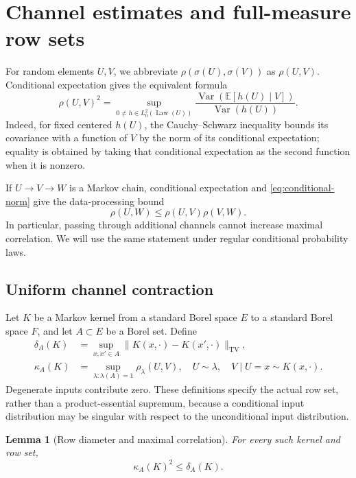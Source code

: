 \documentclass[11pt]{amsart}
\numberwithin{equation}{section}
\newtheorem{lemma}[theorem]{Lemma}
\theoremstyle{definition}
\newcommand{\EE}{\mathbb E}
\newcommand{\TV}{\mathrm{TV}}
\newcommand{\Law}{\operatorname{Law}}
\newcommand{\Var}{\operatorname{Var}}
\begin{document}
\section{Channel estimates and full-measure row sets}\label{sec:channels}

For random elements $U,V$, we abbreviate $\rho(\sigma(U),\sigma(V))$ as $\rho(U,V)$. Conditional expectation gives the equivalent formula
\begin{equation}\label{eq:conditional-norm}
\rho(U,V)^2=
\sup_{0\ne h\in L^2_0(\Law(U))}
\frac{\Var(\EE[h(U)\mid V])}{\Var(h(U))}.
\end{equation}
Indeed, for fixed centered $h(U)$, the Cauchy--Schwarz inequality bounds its covariance with a function of $V$ by the norm of its conditional expectation; equality is obtained by taking that conditional expectation as the second function when it is nonzero.

If $U\longrightarrow V\longrightarrow W$ is a Markov chain, conditional expectation and \eqref{eq:conditional-norm} give the data-processing bound
\begin{equation}\label{eq:dp}
\rho(U,W)\le\rho(U,V)\rho(V,W).
\end{equation}
In particular, passing through additional channels cannot increase maximal correlation. We will use the same statement under regular conditional probability laws.

\subsection{Uniform channel contraction}
Let $K$ be a Markov kernel from a standard Borel space $E$ to a standard Borel space $F$, and let $A\subset E$ be a Borel set. Define
\begin{align}
\delta_A(K)&=\sup_{x,x'\in A}\|K(x,\cdot)-K(x',\cdot)\|_{\TV},\label{eq:diameter}\\
\kappa_A(K)&=\sup_{\lambda:\lambda(A)=1}\rho_\lambda(U,V),
\quad U\sim\lambda,\quad V\mid U=x\sim K(x,\cdot).\label{eq:robust}
\end{align}
Degenerate inputs contribute zero. These definitions specify the actual row set, rather than a product-essential supremum, because a conditional input distribution may be singular with respect to the unconditional input distribution.

\begin{lemma}[Row diameter and maximal correlation]\label{lem:channel}
For every such kernel and row set,
\begin{equation}\label{eq:channel}
\kappa_A(K)^2\le\delta_A(K).
\end{equation}
\end{lemma}
\end{document}
